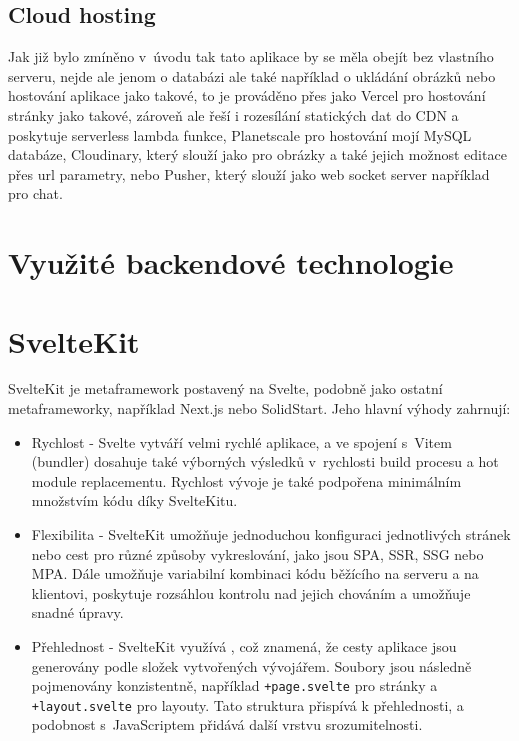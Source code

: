 \documentclass[12pt, a4paper,
openright
]{report}
\begin{document}
\subsection{Cloud hosting}
Jak již bylo zmíněno v~úvodu tak tato aplikace by se měla obejít bez vlastního serveru, nejde ale jenom o databázi ale také například o ukládání obrázků nebo hostování aplikace jako takové, to je prováděno přes  jako Vercel pro hostování stránky jako takové, zároveň ale řeší i rozesílání statických dat do CDN a poskytuje serverless lambda funkce, Planetscale pro hostování mojí MySQL databáze, Cloudinary, který slouží jako  pro obrázky a také jejich možnost editace přes url parametry, nebo Pusher, který slouží jako web socket server například pro chat.

\section{Využité backendové technologie}

\section{SvelteKit}

SvelteKit je metaframework postavený na Svelte, podobně jako ostatní metaframeworky, například Next.js nebo SolidStart. Jeho hlavní výhody zahrnují:
\begin{itemize}
	\item Rychlost - Svelte vytváří velmi rychlé aplikace, a ve spojení s~Vitem (bundler) dosahuje také výborných výsledků v~rychlosti build procesu a hot module replacementu. Rychlost vývoje je také podpořena minimálním množstvím  kódu díky SvelteKitu.
	\item Flexibilita - SvelteKit umožňuje jednoduchou konfiguraci jednotlivých stránek nebo cest pro různé způsoby vykreslování, jako jsou SPA, SSR, SSG nebo MPA. Dále umožňuje variabilní kombinaci kódu běžícího na serveru a na klientovi, poskytuje rozsáhlou kontrolu nad jejich chováním a umožňuje snadné úpravy.
	\item Přehlednost - SvelteKit využívá , což znamená, že cesty aplikace jsou generovány podle složek vytvořených vývojářem. Soubory jsou následně pojmenovány konzistentně, například \texttt{+page.svelte} pro stránky a \texttt{+layout.svelte} pro layouty. Tato struktura přispívá k přehlednosti, a podobnost s~JavaScriptem přidává další vrstvu srozumitelnosti.
\end{itemize} 
\end{document}
